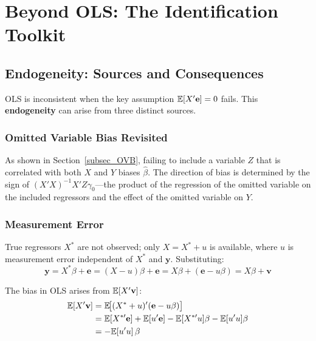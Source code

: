 
\chapter[Beyond OLS]{Beyond OLS: The Identification Toolkit}
\label{chap_BeyondOLS}

\section{Endogeneity: Sources and Consequences}
\label{sec_Endogeneity}

OLS is inconsistent when the key assumption $\mathbb{E}[X'\mathbf{e}] = 0$ fails.
This \textbf{endogeneity} can arise from three distinct
sources.

\subsection{Omitted Variable Bias Revisited}

As shown in Section~\ref{subsec_OVB}, failing to include a variable $Z$ that
is correlated with both $X$ and $Y$ biases $\hat\beta$. The direction of bias
is determined by the sign of $(X'X)^{-1}X'Z\gamma_0$---the product of the
regression of the omitted variable on the included regressors and the effect
of the omitted variable on $Y$.

\subsection{Measurement Error}

True regressors $X^*$ are not observed; only $X = X^* + u$ is available,
where $u$ is measurement error independent of $X^*$ and $\mathbf{y}$.
Substituting:
\begin{equation}
  \mathbf{y} = X^*\beta + \mathbf{e} = (X-u)\beta + \mathbf{e}
             = X\beta + (\mathbf{e} - u\beta) = X\beta + \mathbf{v}
\end{equation}

The bias in OLS arises from $\mathbb{E}[X'\mathbf{v}]$:
\begin{align}
  \mathbb{E}[X'\mathbf{v}]
  &= \mathbb{E}\!\bigl[(X^*+u)'(\mathbf{e}-u\beta)\bigr] \nonumber \\
  &= \mathbb{E}[X^{*\prime}\mathbf{e}] + \mathbb{E}[u'\mathbf{e}]
     - \mathbb{E}[X^{*\prime}u]\beta - \mathbb{E}[u'u]\beta \nonumber \\
  &= -\mathbb{E}[u'u]\,\beta
\end{align}

